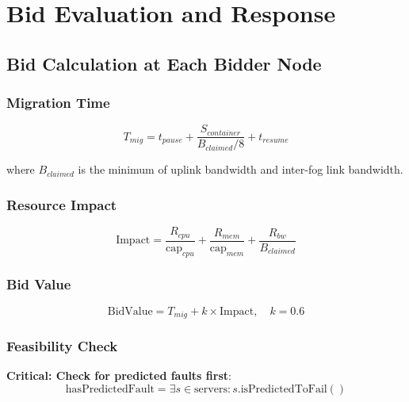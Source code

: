 \documentclass[12pt,a4paper]{article}
\begin{document}
\section{Bid Evaluation and Response}

\subsection{Bid Calculation at Each Bidder Node}

\subsubsection{Migration Time}

\begin{equation}
    T_{mig} = t_{pause} + \frac{S_{container}}{B_{claimed}/8} + t_{resume}
\end{equation}

where $B_{claimed}$ is the minimum of uplink bandwidth and inter-fog link bandwidth.

\subsubsection{Resource Impact}

\begin{equation}
    \text{Impact} = \frac{R_{cpu}}{\text{cap}_{cpu}} + \frac{R_{mem}}{\text{cap}_{mem}} + \frac{R_{bw}}{B_{claimed}}
\end{equation}

\subsubsection{Bid Value}

\begin{equation}
    \text{BidValue} = T_{mig} + k \times \text{Impact}, \quad k = 0.6
\end{equation}

\subsubsection{Feasibility Check}

\textbf{Critical: Check for predicted faults first}:
\begin{equation}
    \text{hasPredictedFault} = \exists s \in \text{servers} : s.\text{isPredictedToFail}()
\end{equation}
\end{document}
